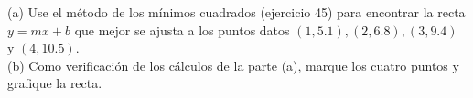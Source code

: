\item (a) Use el método de los mínimos cuadrados (ejercicio 45) para encontrar la recta $y = mx + b$ que mejor se ajusta a los puntos datos $(1, 5.1), (2, 6.8), (3, 9.4)$ y $(4, 10.5)$. \\
(b) Como verificación de los cálculos de la parte (a), marque los cuatro puntos y grafique la recta.
